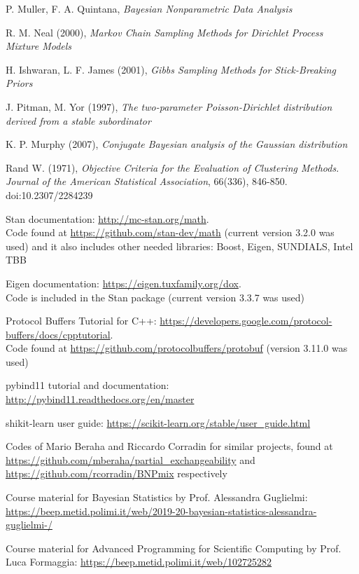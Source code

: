 \documentclass[a4paper]{report}
\begin{document}
\begin{thebibliography}{9}
	 P. Muller, F. A. Quintana, \textit{Bayesian Nonparametric Data Analysis}

	 R. M. Neal (2000), \textit{Markov Chain Sampling Methods for Dirichlet Process Mixture Models}

	 H. Ishwaran, L. F. James (2001), \textit{Gibbs Sampling Methods for Stick-Breaking Priors}

	 J. Pitman, M. Yor (1997), \textit{The two-parameter Poisson-Dirichlet distribution derived from a stable subordinator} 

	 K. P. Murphy (2007), \textit{Conjugate Bayesian analysis of the Gaussian distribution}

	 Rand W. (1971), \textit{Objective Criteria for the Evaluation of Clustering Methods.
	Journal of the American Statistical Association}, 66(336), 846-850. doi:10.2307/2284239

	 Stan documentation: \url{http://mc-stan.org/math}. \\
	Code found at \url{https://github.com/stan-dev/math} (current version 3.2.0 was used) and it also includes other needed libraries: Boost, Eigen, SUNDIALS, Intel TBB

	 Eigen documentation: \url{https://eigen.tuxfamily.org/dox}. \\
	Code is included in the Stan package (current version 3.3.7 was used)

	 Protocol Buffers Tutorial for C++: \url{https://developers.google.com/protocol-buffers/docs/cpptutorial}. \\
	Code found at \url{https://github.com/protocolbuffers/protobuf} (version 3.11.0 was used)

	 pybind11 tutorial and documentation: \url{http://pybind11.readthedocs.org/en/master}
	
	 shikit-learn user guide: \url{https://scikit-learn.org/stable/user_guide.html}

	 Codes of Mario Beraha and Riccardo Corradin for similar projects, found at \url{https://github.com/mberaha/partial_exchangeability} and \url{https://github.com/rcorradin/BNPmix} respectively

	 Course material for Bayesian Statistics by Prof. Alessandra Guglielmi: \url{https://beep.metid.polimi.it/web/2019-20-bayesian-statistics-alessandra-guglielmi-/}
	
	 Course material for Advanced Programming for Scientific Computing by Prof. Luca Formaggia:
	\url{https://beep.metid.polimi.it/web/102725282}
\end{thebibliography}
\end{document}

